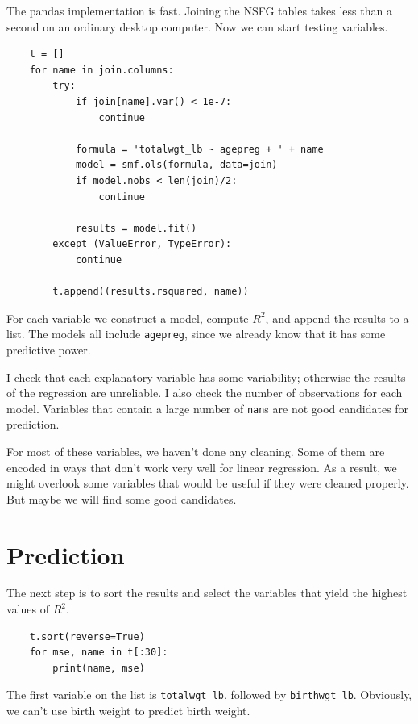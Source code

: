 \documentclass[12pt]{book}
\theoremstyle{exercise}
\begin{document}
The pandas implementation is fast.  Joining the NSFG tables takes
less than a second on an ordinary desktop computer.
Now we can start testing variables.%
%

\begin{verbatim}
    t = []
    for name in join.columns:
        try:
            if join[name].var() < 1e-7:
                continue

            formula = 'totalwgt_lb ~ agepreg + ' + name
            model = smf.ols(formula, data=join)
            if model.nobs < len(join)/2:
                continue

            results = model.fit()
        except (ValueError, TypeError):
            continue

        t.append((results.rsquared, name))
\end{verbatim}

For each variable we construct a model, compute $R^2$, and append
the results to a list.  The models all include {\tt agepreg}, since
we already know that it has some predictive power.%
%
%

I check that each explanatory variable has some variability; otherwise
the results of the regression are unreliable.  I also check the number
of observations for each model.  Variables that contain a large number
of {\tt nan}s are not good candidates for prediction.%
%

For most of these variables, we haven't done any cleaning.  Some of them
are encoded in ways that don't work very well for linear regression.
As a result, we might overlook some variables that would be useful if
they were cleaned properly.  But maybe we will find some good candidates.%


\section{Prediction}

The next step is to sort the results and select the variables that
yield the highest values of $R^2$.%

\begin{verbatim}
    t.sort(reverse=True)
    for mse, name in t[:30]:
        print(name, mse)
\end{verbatim}

The first variable on the list is \verb"totalwgt_lb",
followed by \verb"birthwgt_lb".  Obviously, we can't use birth
weight to predict birth weight.%
%
\end{document}
